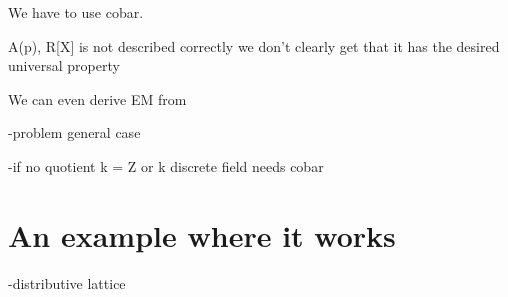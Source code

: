 \documentclass[10pt,a4paper]{article}
\begin{document}
\todo[inline]{}

 We have to use cobar. %


A(p), R[X] is not described correctly
we don't clearly get that it has the desired universal property

We can even derive EM from


-problem general case

-if no quotient k = Z or k discrete field needs cobar

\section{An example where it works}

-distributive lattice




\end{document}
